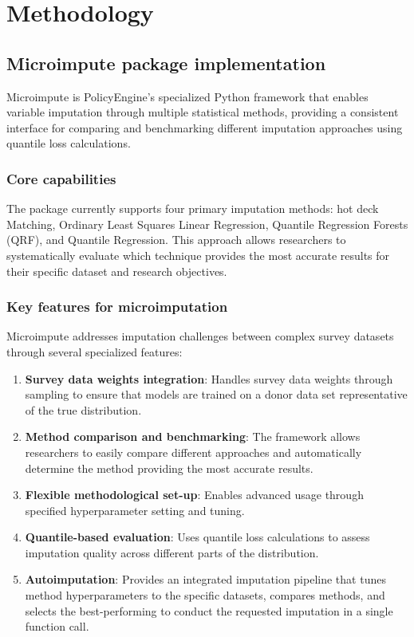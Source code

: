\section{Methodology}\label{sec:methodology}

\subsection{Microimpute package implementation}

Microimpute is PolicyEngine's specialized Python framework that enables variable imputation through multiple statistical methods, providing a consistent interface for comparing and benchmarking different imputation approaches using quantile loss calculations.

\subsubsection{Core capabilities}

The package currently supports four primary imputation methods: hot deck Matching, Ordinary Least Squares Linear Regression, Quantile Regression Forests (QRF), and Quantile Regression. This approach allows researchers to systematically evaluate which technique provides the most accurate results for their specific dataset and research objectives.

\subsubsection{Key features for microimputation}

Microimpute addresses imputation challenges between complex survey datasets through several specialized features:

\begin{enumerate}
    \item \textbf{Survey data weights integration}: Handles survey data weights through sampling to ensure that models are trained on a donor data set representative of the true distribution.
    \item \textbf{Method comparison and benchmarking}: The framework allows researchers to easily compare different approaches and automatically determine the method providing the most accurate results.
    \item \textbf{Flexible methodological set-up}: Enables advanced usage through specified hyperparameter setting and tuning.
    \item \textbf{Quantile-based evaluation}: Uses quantile loss calculations to assess imputation quality across different parts of the distribution.
    \item \textbf{Autoimputation}: Provides an integrated imputation pipeline that tunes method hyperparameters to the specific datasets, compares methods, and selects the best-performing to conduct the requested imputation in a single function call.
\end{enumerate}

